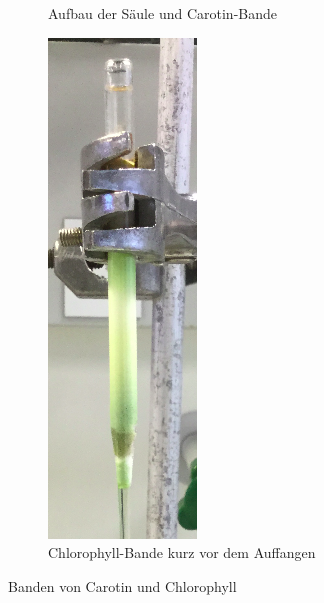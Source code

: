 \documentclass{article}
\begin{document}
\begin{figure}
\begin{subfigure}{.5\textwidth}
          \caption{Aufbau der Säule und Carotin-Bande}
          \label{fig:TrennungCarotin}
        \end{subfigure}%
        \begin{subfigure}{.5\textwidth}
          \centering
          \includegraphics[width=.4\linewidth]{Graphiken/Versuchsanordnungen/TrennungChlorophyll.png}
          \caption{Chlorophyll-Bande kurz vor dem Auffangen}
          \label{fig:TrennungChlorophyll}
        \end{subfigure}
        \caption[Banden von Carotin und Chlorophyll, Quelle, Autor]{Banden von Carotin und Chlorophyll}
        \label{fig:TrennungSpinat}
      \end{figure}
      
  \pagebreak
  
  \printbibliography[title=Literaturverzeichnis]
  \listoffigures
  \listoftables
  
\end{document}
